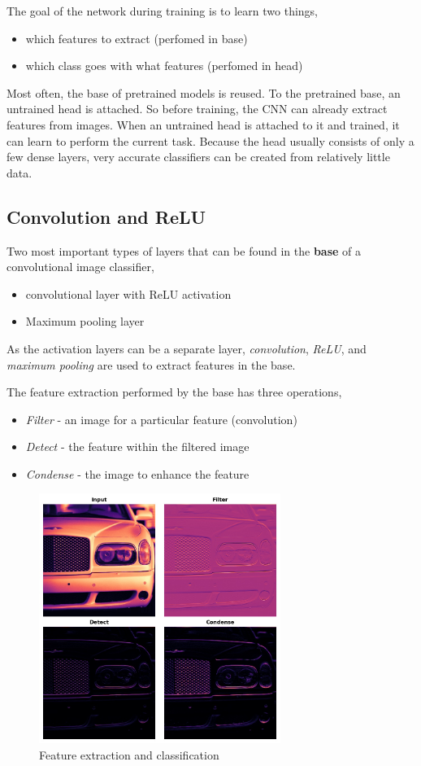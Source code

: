 \noindent The goal of the network during training is to learn two things, 
\begin{itemize}
	\item which features to extract (perfomed in base)
	\item which class goes with what features (perfomed in head)
\end{itemize}

\noindent Most often, the base of pretrained models is reused. To the pretrained base, an untrained
head is attached. So before training, the CNN can already extract features from images. When an
untrained head is attached to it and trained, it can learn to perform the current task.
Because the head usually consists of only a few dense layers, very accurate classifiers can be 
created from relatively little data.



\subsection{Convolution and ReLU}
\noindent Two most important types of layers that can be found in the \textbf{base} of a convolutional
image classifier,
\begin{itemize}
	\item convolutional layer with ReLU activation
	\item Maximum pooling layer
\end{itemize}

\noindent As the activation layers can be a separate layer, \emph{convolution}, \emph{ReLU}, and
\emph{maximum pooling} are used to extract features in the base.

\noindent The feature extraction performed by the base has three operations,
\begin{itemize}
	\item \emph{Filter} - an image for a particular feature (convolution)
	\item \emph{Detect} - the feature within the filtered image
	\item \emph{Condense} - the image to enhance the feature
\end{itemize}

\begin{figure}[htp]
	\centering
	\includegraphics[width=0.7\textwidth]{../assets/machine_learning_random/3_steps_of_feature_extraction.png}
	\caption{Feature extraction and classification}
\end{figure}


